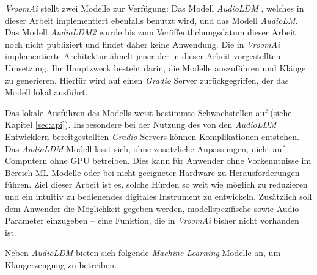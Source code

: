 \documentclass[
  a4paper,  %
  twoside,  %
  bibliography=totoc,
  headsepline,
  cleardoublepage=empty,
  parskip=half,
  draft=false
]{scrbook}
\begin{document}
\emph{VroomAi} stellt zwei Modelle zur Verfügung: Das Modell \emph{AudioLDM} \cite{liu_audioldm_2023}, welches in dieser Arbeit implementiert ebenfalls benutzt wird, und das Modell \emph{AudioLM}\cite{borsos_audiolm_2022}. Das Modell \emph{AudioLDM2} wurde bis zum Veröffentlichungsdatum dieser Arbeit noch nicht publiziert und findet daher keine Anwendung. Die in \emph{VroomAi} implementierte Architektur ähnelt jener der in dieser Arbeit vorgestellten Umsetzung. Ihr Hauptzweck besteht darin, die Modelle auszuführen und Klänge zu generieren. Hierfür wird auf einen \emph{Gradio} Server \cite{team_gradio_gradio_nodate} zurückgegriffen, der das Modell lokal ausführt.

Das lokale Ausführen des Modells weist bestimmte Schwachstellen auf (siehe Kapitel \ref{sec:api}). Insbesondere bei der Nutzung des von den \emph{AudioLDM} Entwicklern bereitgestellten \emph{Gradio}-Servers können Komplikationen entstehen. Das \emph{AudioLDM} Modell lässt sich, ohne zusätzliche Anpassungen, nicht auf Computern ohne GPU betreiben. Dies kann für Anwender ohne Vorkenntnisse im Bereich ML-Modelle oder bei nicht geeigneter Hardware zu Herausforderungen führen. Ziel dieser Arbeit ist es, solche Hürden so weit wie möglich zu reduzieren und ein intuitiv zu bedienendes digitales Instrument zu entwickeln. Zusätzlich soll dem Anwender die Möglichkeit gegeben werden, modellspezifische sowie Audio-Parameter einzugeben – eine Funktion, die in \emph{VroomAi} bisher nicht vorhanden ist.

Neben \emph{AudioLDM} \cite{liu_audioldm_2023} bieten sich folgende \emph{Machine-Learning} Modelle an, um Klangerzeugung zu betreiben.
\end{document}
